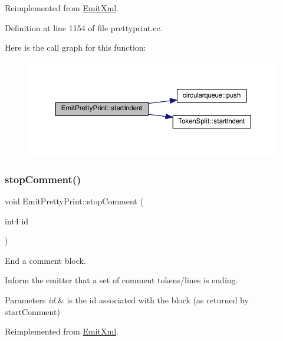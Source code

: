 Reimplemented from \mbox{\hyperlink{class_emit_xml_ae9ed06a8d8049b22634eb06799d3ec3d}{Emit\+Xml}}.



Definition at line 1154 of file prettyprint.\+cc.

Here is the call graph for this function\+:
\nopagebreak
\begin{figure}[H]
\begin{center}
\leavevmode
\includegraphics[width=350pt]{class_emit_pretty_print_a3c08c45b256a71e9e93864dd7ef4860b_cgraph}
\end{center}
\end{figure}
\mbox{\label{class_emit_pretty_print_ad87969dcd6426529f85890b8ed6bb687}} 
\subsubsection{\texorpdfstring{stopComment()}{stopComment()}}
{\footnotesize\ttfamily void Emit\+Pretty\+Print\+::stop\+Comment (\begin{DoxyParamCaption}\item[{int4}]{id }\end{DoxyParamCaption})\hspace{0.3cm}{\ttfamily [virtual]}}



End a comment block. 

Inform the emitter that a set of comment tokens/lines is ending. 
\begin{DoxyParams}{Parameters}
{\em id} & is the id associated with the block (as returned by start\+Comment) \\
\hline
\end{DoxyParams}


Reimplemented from \mbox{\hyperlink{class_emit_xml_abd12549a4f041d4358064a452ded5301}{Emit\+Xml}}.



